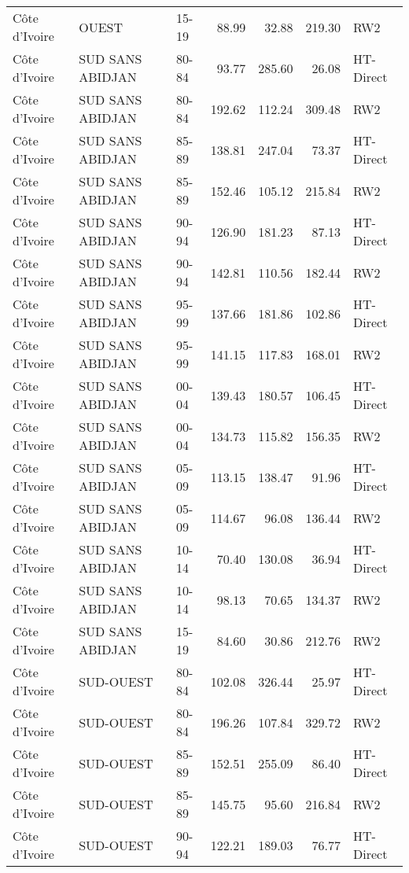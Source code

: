 \begin{longtable}{lllrrrl}
  C\^{o}te d'Ivoire & OUEST & 15-19 & 88.99 & 32.88 & 219.30 & RW2 \\ 
  C\^{o}te d'Ivoire & SUD SANS ABIDJAN & 80-84 & 93.77 & 285.60 & 26.08 & HT-Direct \\ 
  C\^{o}te d'Ivoire & SUD SANS ABIDJAN & 80-84 & 192.62 & 112.24 & 309.48 & RW2 \\ 
  C\^{o}te d'Ivoire & SUD SANS ABIDJAN & 85-89 & 138.81 & 247.04 & 73.37 & HT-Direct \\ 
  C\^{o}te d'Ivoire & SUD SANS ABIDJAN & 85-89 & 152.46 & 105.12 & 215.84 & RW2 \\ 
  C\^{o}te d'Ivoire & SUD SANS ABIDJAN & 90-94 & 126.90 & 181.23 & 87.13 & HT-Direct \\ 
  C\^{o}te d'Ivoire & SUD SANS ABIDJAN & 90-94 & 142.81 & 110.56 & 182.44 & RW2 \\ 
  C\^{o}te d'Ivoire & SUD SANS ABIDJAN & 95-99 & 137.66 & 181.86 & 102.86 & HT-Direct \\ 
  C\^{o}te d'Ivoire & SUD SANS ABIDJAN & 95-99 & 141.15 & 117.83 & 168.01 & RW2 \\ 
  C\^{o}te d'Ivoire & SUD SANS ABIDJAN & 00-04 & 139.43 & 180.57 & 106.45 & HT-Direct \\ 
  C\^{o}te d'Ivoire & SUD SANS ABIDJAN & 00-04 & 134.73 & 115.82 & 156.35 & RW2 \\ 
  C\^{o}te d'Ivoire & SUD SANS ABIDJAN & 05-09 & 113.15 & 138.47 & 91.96 & HT-Direct \\ 
  C\^{o}te d'Ivoire & SUD SANS ABIDJAN & 05-09 & 114.67 & 96.08 & 136.44 & RW2 \\ 
  C\^{o}te d'Ivoire & SUD SANS ABIDJAN & 10-14 & 70.40 & 130.08 & 36.94 & HT-Direct \\ 
  C\^{o}te d'Ivoire & SUD SANS ABIDJAN & 10-14 & 98.13 & 70.65 & 134.37 & RW2 \\ 
  C\^{o}te d'Ivoire & SUD SANS ABIDJAN & 15-19 & 84.60 & 30.86 & 212.76 & RW2 \\ 
  C\^{o}te d'Ivoire & SUD-OUEST & 80-84 & 102.08 & 326.44 & 25.97 & HT-Direct \\ 
  C\^{o}te d'Ivoire & SUD-OUEST & 80-84 & 196.26 & 107.84 & 329.72 & RW2 \\ 
  C\^{o}te d'Ivoire & SUD-OUEST & 85-89 & 152.51 & 255.09 & 86.40 & HT-Direct \\ 
  C\^{o}te d'Ivoire & SUD-OUEST & 85-89 & 145.75 & 95.60 & 216.84 & RW2 \\ 
  C\^{o}te d'Ivoire & SUD-OUEST & 90-94 & 122.21 & 189.03 & 76.77 & HT-Direct \\ 

\end{longtable}

